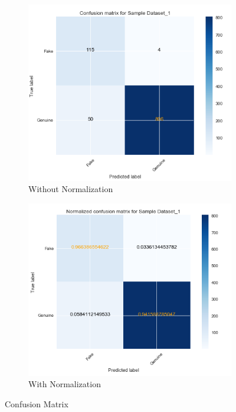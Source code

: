 \documentclass[a4paper, twoside, 12pt]{report}
\begin{document}
\begin{figure}[H]
	\centering
	\begin{subfigure}{.5\textwidth}
		\centering
		\includegraphics[scale=0.6]{matrix_1}
		\caption{Without Normalization}
		\label{fig:sub1}
	\end{subfigure}%
	\begin{subfigure}{.5\textwidth}
		\centering
		\includegraphics[scale=0.6]{matrix_nor_1}
		\caption{With Normalization}
		\label{fig:sub2}
	\end{subfigure}
	\caption{Confusion Matrix}
\end{figure}
\end{document}
